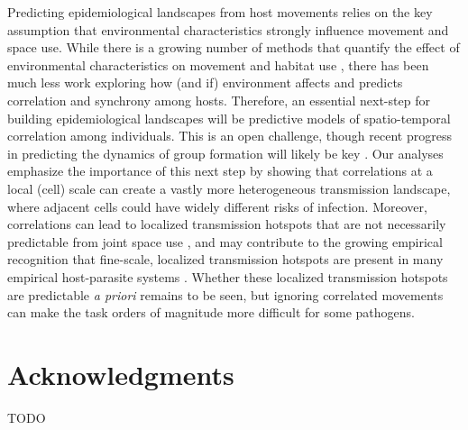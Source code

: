 \documentclass[letterpaper]{article}
\begin{document}
Predicting epidemiological landscapes from host movements relies on the key assumption that environmental characteristics strongly influence movement and space use. While there is a growing number of methods that quantify the effect of environmental characteristics on movement and habitat use \citep[reviewed in][]{Hooten2017a}, there has been much less work exploring how (and if) environment affects and predicts correlation and synchrony among hosts.  Therefore, an essential next-step for building epidemiological landscapes will be predictive models of spatio-temporal correlation among individuals.  This is an open challenge, though recent progress in predicting the dynamics of group formation will likely be key \citep[e.g.][]{Brandell2021}.
Our analyses emphasize the importance of this next step by showing that correlations at a local (cell) scale can create a vastly more heterogeneous transmission landscape, where adjacent cells could have widely different risks of infection.  Moreover, correlations can lead to localized transmission hotspots that are not necessarily predictable from joint space use \citep{Yang2023a}, and may contribute to the growing empirical recognition that fine-scale, localized transmission hotspots are present in many empirical host-parasite systems \citep{Albery2021}.  Whether these localized transmission hotspots are predictable \emph{a priori} remains to be seen, but ignoring correlated movements can make the task orders of magnitude more difficult for some pathogens.

\section*{Acknowledgments}

TODO

\clearpage
\end{document}
